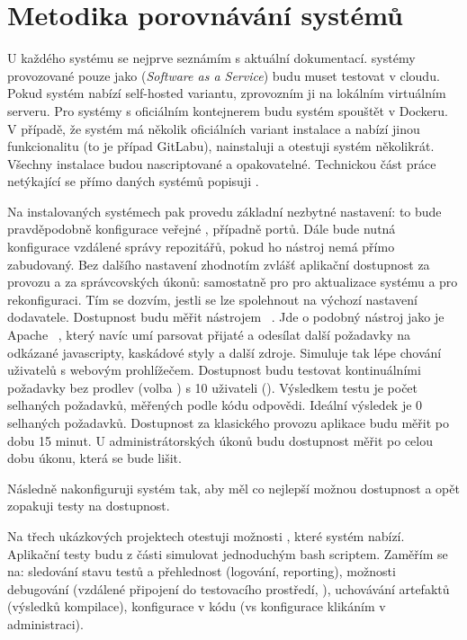 \section{Metodika porovnávání \CICD systémů}
    U každého systému se nejprve seznámím s aktuální dokumentací. \CICD systémy provozované pouze jako  (\textit{Software as a Service}) budu muset testovat v cloudu. Pokud systém nabízí self-hosted variantu, zprovozním ji na lokálním virtuálním serveru. Pro systémy s oficiálním kontejnerem budu systém spouštět v Dockeru. V případě, že systém má několik oficiálních variant instalace a nabízí jinou funkcionalitu (to je případ GitLabu), nainstaluji a otestuji systém několikrát. Všechny instalace budou nascriptované a opakovatelné. Technickou část práce netýkající se přímo daných \CICD systémů popisuji .

    Na instalovaných systémech pak provedu základní nezbytné nastavení: to bude pravděpodobně konfigurace veřejné , případně portů. Dále bude nutná konfigurace vzdálené správy repozitářů, pokud ho \CICD nástroj nemá přímo zabudovaný. Bez dalšího nastavení zhodnotím zvlášť aplikační dostupnost za provozu a za správcovských úkonů: samostatně pro pro aktualizace \CI systému a pro rekonfiguraci. Tím se dozvím, jestli se lze spolehnout na výchozí nastavení dodavatele. Dostupnost budu měřit nástrojem ~\cite{fulmer-siege}. Jde o podobný nástroj jako je Apache ~\cite{apache-ab}, který navíc umí parsovat přijaté  a odesílat další požadavky na odkázané javascripty, kaskádové styly a další zdroje. Simuluje tak lépe chování uživatelů s webovým prohlížečem. Dostupnost budu testovat kontinuálními požadavky bez prodlev (volba ) s 10 uživateli (). Výsledkem testu je počet selhaných požadavků, měřených podle \HTTP kódu odpovědi. Ideální výsledek je 0 selhaných požadavků. Dostupnost za klasického provozu aplikace budu měřit po dobu 15 minut. U administrátorských úkonů budu dostupnost měřit po celou dobu úkonu, která se bude lišit.

    Následně nakonfiguruji systém tak, aby měl co nejlepší možnou dostupnost a opět zopakuji testy na dostupnost.

    Na třech ukázkových projektech otestuji možnosti \CI, které systém nabízí. Aplikační testy budu z části simulovat jednoduchým bash scriptem.  Zaměřím se na: sledování stavu testů a přehlednost (logování, reporting), možnosti debugování (vzdálené připojení do testovacího prostředí, ), uchovávání artefaktů (výsledků kompilace), konfigurace v kódu (vs konfigurace klikáním v administraci).

